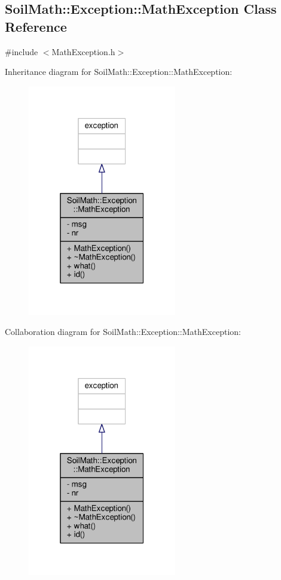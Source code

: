 \hypertarget{class_soil_math_1_1_exception_1_1_math_exception}{}\subsection{Soil\+Math\+:\+:Exception\+:\+:Math\+Exception Class Reference}
\label{class_soil_math_1_1_exception_1_1_math_exception}


{\ttfamily \#include $<$Math\+Exception.\+h$>$}



Inheritance diagram for Soil\+Math\+:\+:Exception\+:\+:Math\+Exception\+:
\nopagebreak
\begin{figure}[H]
\begin{center}
\leavevmode
\includegraphics[width=184pt]{class_soil_math_1_1_exception_1_1_math_exception__inherit__graph}
\end{center}
\end{figure}


Collaboration diagram for Soil\+Math\+:\+:Exception\+:\+:Math\+Exception\+:
\nopagebreak
\begin{figure}[H]
\begin{center}
\leavevmode
\includegraphics[width=184pt]{class_soil_math_1_1_exception_1_1_math_exception__coll__graph}
\end{center}
\end{figure}
